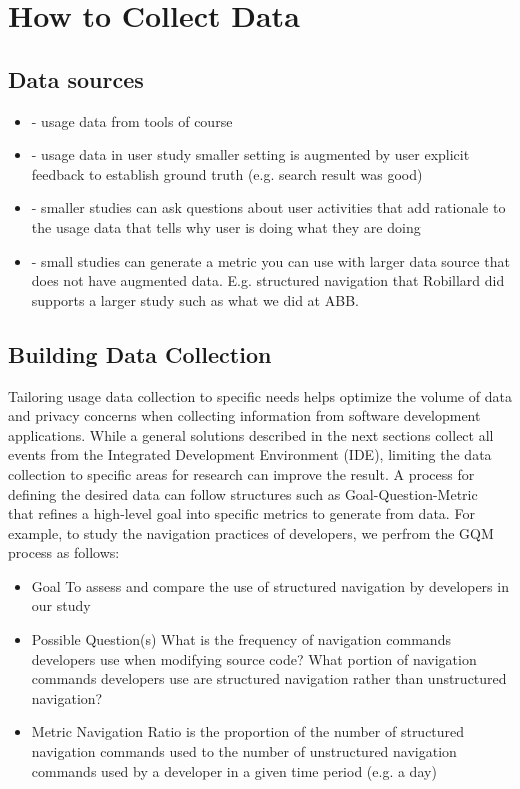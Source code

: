 \section{How to Collect Data}



\subsection{ Data sources}
    \begin{itemize}
    \item
	- usage data from tools of course
\item
	- usage data in user study smaller setting is augmented by user explicit feedback to establish ground truth (e.g. search result was good)
\item
	- smaller studies can ask questions about user activities that add rationale to the usage data that tells why user is doing what they are doing
\item
	- small studies can generate a metric you can use with larger data source that does not have augmented data.  E.g. structured navigation that Robillard did supports a larger study such as what we did at ABB.
    \end{itemize}

\subsection{ Building Data Collection} %


	Tailoring usage data collection to specific needs helps optimize the volume of data and privacy concerns when collecting information from software development applications.  While a general solutions described in the next sections collect all events from the Integrated Development Environment (IDE), limiting the data collection to specific areas for research can improve the result.  A process for defining the desired data can follow structures such as Goal-Question-Metric~\cite{basili-GQM}  that refines a high-level goal into specific metrics to generate from data.  For example, to study the navigation practices of developers, we perfrom the GQM process as follows:
    \begin{itemize}
\item
	Goal
\subitem
	To assess and compare the use of structured navigation by developers in our study
\item
	Possible Question(s)
\subitem
	What is the frequency  of navigation commands developers use when modifying source code?
\subitem
	What portion of navigation commands developers use are structured navigation rather than unstructured navigation?
\item
	Metric
\subitem
	Navigation Ratio is the proportion of the number of structured navigation commands used to the number of unstructured navigation commands used by a developer in a given time period (e.g. a day)

	    \end{itemize}

